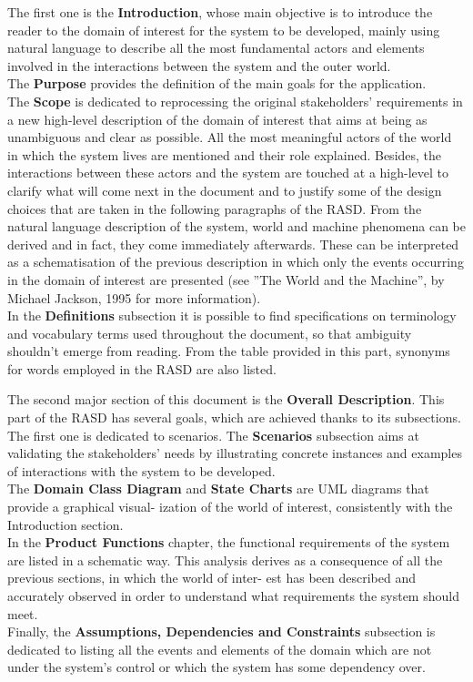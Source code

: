 The first one is the \textbf{Introduction}, whose main objective is to introduce the reader to the domain
of interest for the system to be developed, mainly using natural language to describe all the most
fundamental actors and elements involved in the interactions between the system and the outer world. \\
The \textbf{Purpose} provides the definition of the main goals for the application. \\
The \textbf{Scope} is dedicated to reprocessing the original stakeholders’ requirements in a new high-level
description of the domain of interest that aims at being as unambiguous and clear as possible. All the
most meaningful actors of the world in which the system lives are mentioned and their role explained.
Besides, the interactions between these actors and the system are touched at a high-level to clarify
what will come next in the document and to justify some of the design choices that are taken in the
following paragraphs of the RASD. From the natural language description of the system, world and
machine phenomena can be derived and in fact, they come immediately afterwards. These can be
interpreted as a schematisation of the previous description in which only the events occurring in the
domain of interest are presented (see ”The World and the Machine”, by Michael Jackson, 1995 for
more information). \\
In the \textbf{Definitions} subsection it is possible to find specifications on terminology and vocabulary terms
used throughout the document, so that ambiguity shouldn’t emerge from reading. From the table
provided in this part, synonyms for words employed in the RASD are also listed.

The second major section of this document is the \textbf{Overall Description}. This part of the RASD has
several goals, which are achieved thanks to its subsections. \\
The first one is dedicated to scenarios. The \textbf{Scenarios} subsection aims at validating the stakeholders’
needs by illustrating concrete instances and examples of interactions with the system to be developed. \\
The \textbf{Domain Class Diagram} and \textbf{State Charts} are UML diagrams that provide a graphical visual-
ization of the world of interest, consistently with the Introduction section. \\
In the \textbf{Product Functions} chapter, the functional requirements of the system are listed in a schematic
way. This analysis derives as a consequence of all the previous sections, in which the world of inter-
est has been described and accurately observed in order to understand what requirements the system
should meet. \\
Finally, the \textbf{Assumptions, Dependencies and Constraints} subsection is dedicated to listing all the
events and elements of the domain which are not under the system’s control or which the system has
some dependency over.

